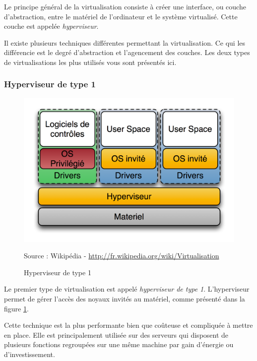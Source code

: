Le principe général de la virtualisation consiste à créer une interface, ou couche d'abstraction, entre le matériel de l'ordinateur et le système virtualisé.
Cette couche est appelée \textit{hyperviseur}.

Il existe plusieurs techniques différentes permettant la virtualisation.
Ce qui les différencie est le degré d'abstraction et l'agencement des couches.
Les deux types de virtualisations les plus utilisés vous sont présentés ici. 
\\




\subsubsection{Hyperviseur de type 1}

\begin{figure}[!h]
	\center
	\includegraphics[scale=0.7]{img/Hyperviseur_type1.png}
	\caption{Hyperviseur de type 1}
	Source : Wikipédia - \href{http://fr.wikipedia.org/wiki/Virtualisation}{http://fr.wikipedia.org/wiki/Virtualisation}
	\label{Schéma Hyperviseur 1}
\end{figure}

Le premier type de virtualisation est appelé \textit{hyperviseur de type 1}.
L'hyperviseur permet de gérer l'accès des noyaux invités au matériel, comme présenté dans la figure \ref{Schéma Hyperviseur 1}.

Cette technique est la plus performante bien que coûteuse et compliquée à mettre en place.
Elle est principalement utilisée sur des serveurs qui disposent de plusieurs fonctions regroupées sur une même machine par gain d'énergie ou d'investissement.
\\



